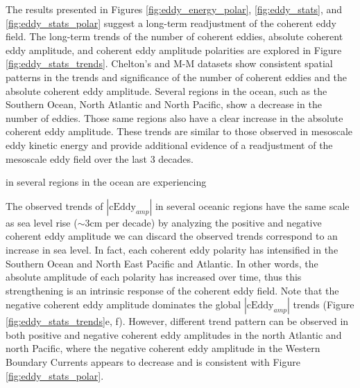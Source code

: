 \documentclass[draft,linenumbers]{agujournal2019}
\newcommand{\cEddy}{\textrm{cEddy}}
\begin{document}

	The results presented in Figures \ref{fig:eddy_energy_polar}, \ref{fig:eddy_stats}, and  \ref{fig:eddy_stats_polar} suggest a long-term readjustment of the coherent eddy field. 
	The long-term trends of the number of coherent eddies, absolute coherent eddy amplitude, and coherent eddy amplitude polarities are explored in Figure \ref{fig:eddy_stats_trends}. 
	Chelton's and M-M datasets show consistent spatial patterns in the trends and significance of the number of coherent eddies and the absolute coherent eddy amplitude. 
	Several regions in the ocean, such as the Southern Ocean, North Atlantic and North Pacific, show a decrease in the number of eddies. Those same regions also have a clear increase in the absolute coherent eddy amplitude. 
	These trends are similar to those observed in mesoscale eddy kinetic energy \citep{Martinez_Kinetic_2021} and provide additional evidence of a readjustment of the mesoscale eddy field over the last 3 decades. 
	
	in several regions in the ocean are experiencing 

	The observed trends of $|\cEddy_{amp}|$ in several oceanic regions have the same scale as sea level rise ($\sim$3cm per decade) by analyzing the positive and negative coherent eddy amplitude we can discard the observed trends correspond to an increase in sea level. 
	In fact, each coherent eddy polarity has intensified in the Southern Ocean and North East Pacific and Atlantic. 
	In other words, the absolute amplitude of each polarity has increased over time, thus this strengthening is an intrinsic response of the coherent eddy field. Note that the negative coherent eddy amplitude dominates the global $|\cEddy_{amp}|$ trends (Figure \ref{fig:eddy_stats_trends}e, f). However, different trend pattern can be observed in both positive and negative coherent eddy amplitudes in the north Atlantic and north Pacific, where the negative coherent eddy amplitude in the  Western Boundary Currents appears to decrease and is consistent with Figure \ref{fig:eddy_stats_polar}.
\end{document}

